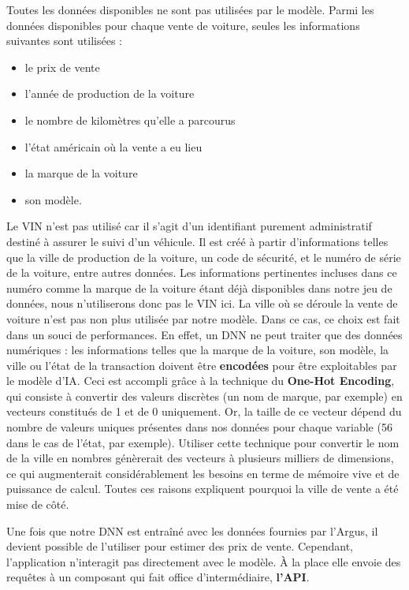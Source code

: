 \documentclass[french]{article}
\begin{document}
    Toutes les données disponibles ne sont pas utilisées par le modèle. Parmi les données disponibles pour chaque vente de voiture, seules les informations suivantes sont utilisées :
    \begin{itemize}
        \item le prix de vente
        \item l'année de production de la voiture
        \item le nombre de kilomètres qu'elle a parcourus
        \item l'état américain où la vente a eu lieu
        \item la marque de la voiture
        \item son modèle.
    \end{itemize}
    Le VIN n'est pas utilisé car il s'agit d'un identifiant purement administratif destiné à assurer le suivi d'un véhicule. Il est créé à partir d'informations telles que la ville de production de la voiture, un code de sécurité, et le numéro de série de la voiture, entre autres données. Les informations pertinentes incluses dans ce numéro comme la marque de la voiture étant déjà disponibles dans notre jeu de données, nous n'utiliserons donc pas le VIN ici.
    La ville où se déroule la vente de voiture n'est pas non plus utilisée par notre modèle. Dans ce cas, ce choix est fait dans un souci de performances. En effet, un DNN ne peut traiter que des données numériques : les informations telles que la marque de la voiture, son modèle, la ville ou l'état de la transaction doivent être \textbf{encodées} pour être exploitables par le modèle d'IA. Ceci est accompli grâce à la technique du \textbf{One-Hot Encoding}, qui consiste à convertir des valeurs discrètes (un nom de marque, par exemple) en vecteurs constitués de 1 et de 0 uniquement. Or, la taille de ce vecteur dépend du nombre de valeurs uniques présentes dans nos données pour chaque variable (56 dans le cas de l'état, par exemple). Utiliser cette technique pour convertir le nom de la ville en nombres génèrerait des vecteurs à plusieurs milliers de dimensions, ce qui augmenterait considérablement les besoins en terme de mémoire vive et de puissance de calcul. Toutes ces raisons expliquent pourquoi la ville de vente a été mise de côté.
    
    Une fois que notre DNN est entraîné avec les données fournies par l'Argus, il devient possible de l'utiliser pour estimer des prix de vente. Cependant, l'application n'interagit pas directement avec le modèle. À la place elle envoie des requêtes à un composant qui fait office d'intermédiaire, \textbf{l'API}.
\end{document}
